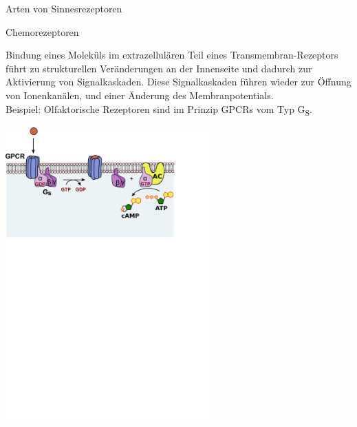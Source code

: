 \documentclass[aspectratio=169]{beamer}
\begin{document}
\begin{frame}{Arten von Sinnesrezeptoren}


\begin{block}{Chemorezeptoren}

Bindung eines Moleküls im extrazellulären Teil eines Transmembran-Rezeptors führt zu strukturellen Veränderungen an der Innenseite und dadurch zur Aktivierung von Signalkaskaden. Diese Signalkaskaden führen wieder zur Öffnung von Ionenkanälen, und einer Änderung des Membranpotentials.   \\

Beispiel: Olfaktorische Rezeptoren sind im Prinzip GPCRs vom Typ G\textsubscript{S}. 


\end{block}

\begin{center}
    \includegraphics[width=0.6\textwidth]{GPCR_Gs_pathway.png}
\end{center}


\end{frame}
\end{document}

